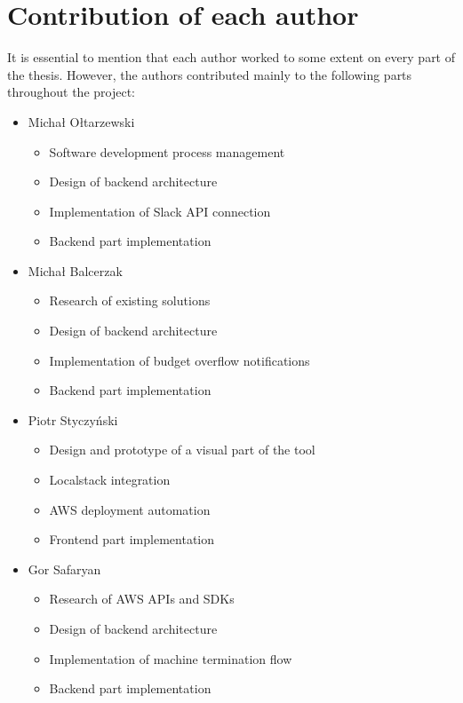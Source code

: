 \documentclass[licencjacka,en]{thesisclass}
\begin{document}
    \section{Contribution of each author}

    It is essential to mention that each author worked to some extent on every part of the thesis.
    However, the authors contributed mainly to the following parts throughout the project:

    \begin{itemize}
        \item Michał Ołtarzewski
        \begin{itemize}
            \item Software development process management
            \item Design of backend architecture
            \item Implementation of Slack API connection
            \item Backend part implementation
        \end{itemize}
        \item Michał Balcerzak
        \begin{itemize}
            \item Research of existing solutions
            \item Design of backend architecture
            \item Implementation of budget overflow notifications
            \item Backend part implementation
        \end{itemize}
        \item Piotr Styczyński
        \begin{itemize}
            \item Design and prototype of a visual part of the tool
            \item Localstack integration
            \item AWS deployment automation
            \item Frontend part implementation
        \end{itemize}
        \item Gor Safaryan
        \begin{itemize}
            \item Research of AWS APIs and SDKs
            \item Design of backend architecture
            \item Implementation of machine termination flow
            \item Backend part implementation
        \end{itemize}
    \end{itemize}
\end{document}
